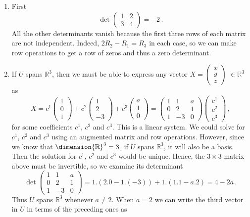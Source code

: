 \begin{enumerate}
\item First 
\[\det\begin{pmatrix}1&2\\3&4\end{pmatrix}=-2\, .\]
All the other determinants vanish because the first three rows of each matrix are not independent. 
Indeed, $2R_2-R_1=R_3$ in each case, so we can make row operations to get a row of zeros and thus a zero determinant. 

\item If $U$ spans ${\mathbb R}^3$, then we must be able to express any vector $X=\begin{pmatrix}x\\y\\z\end{pmatrix}$ $\in {\mathbb R}^3$
as
\[
X=c^1\begin{pmatrix}1\\0\\1\end{pmatrix}+c^2\begin{pmatrix}1\\2\\-3\end{pmatrix}+c^3\begin{pmatrix}a\\1\\0\end{pmatrix}
=\begin{pmatrix}1&1&a\\0&2&1\\1&-3&0\end{pmatrix}\begin{pmatrix}c^1\\c^2\\c^3\end{pmatrix}\, ,
\]
for some coefficients $c^1$, $c^2$ and $c^3$. This is a linear system. We could solve for $c^1$, $c^2$ and $c^3$ using an
augmented matrix and row operations. However, since we know that $\dimension{\mathbb R}^3=3$, if $U$ spans ${\mathbb R}^3$,
it will also be a basis. Then the solution for  $c^1$, $c^2$ and $c^3$ would be unique. Hence, the $3\times 3$ matrix above must 
be invertible, so we examine its determinant
\[
\det\begin{pmatrix}1&1&a\\0&2&1\\1&-3&0\end{pmatrix}
=1.(2.0-1.(-3))+1.(1.1-a.2)=4-2a\, .
\]
Thus $U$ spans ${\mathbb R}^3$ whenever $a\neq 2$. When $a=2$ we can write the third vector in $U$ in terms of the preceding ones as

\end{enumerate}
